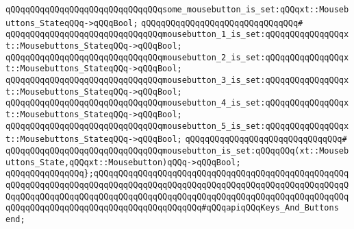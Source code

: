 \verb|qQQqqQQqqQQqqQQqqQQqqQQqqQQqqQQqsome_mousebutton_is_set:qQQqxt::Mousebuttons_StateqQQq->qQQqBool;|\newline
\verb|qQQqqQQqqQQqqQQqqQQqqQQqqQQqqQQq#|\newline
\verb|qQQqqQQqqQQqqQQqqQQqqQQqqQQqqQQqmousebutton_1_is_set:qQQqqQQqqQQqqQQqxt::Mousebuttons_StateqQQq->qQQqBool;|\newline
\verb|qQQqqQQqqQQqqQQqqQQqqQQqqQQqqQQqmousebutton_2_is_set:qQQqqQQqqQQqqQQqxt::Mousebuttons_StateqQQq->qQQqBool;|\newline
\verb|qQQqqQQqqQQqqQQqqQQqqQQqqQQqqQQqmousebutton_3_is_set:qQQqqQQqqQQqqQQqxt::Mousebuttons_StateqQQq->qQQqBool;|\newline
\verb|qQQqqQQqqQQqqQQqqQQqqQQqqQQqqQQqmousebutton_4_is_set:qQQqqQQqqQQqqQQqxt::Mousebuttons_StateqQQq->qQQqBool;|\newline
\verb|qQQqqQQqqQQqqQQqqQQqqQQqqQQqqQQqmousebutton_5_is_set:qQQqqQQqqQQqqQQqxt::Mousebuttons_StateqQQq->qQQqBool;|\newline
\verb|qQQqqQQqqQQqqQQqqQQqqQQqqQQqqQQq#|\newline
\verb|qQQqqQQqqQQqqQQqqQQqqQQqqQQqqQQqmousebutton_is_set:qQQqqQQq(xt::Mousebuttons_State,qQQqxt::Mousebutton)qQQq->qQQqBool;|\newline
\newline
\verb|qQQqqQQqqQQqqQQq};qQQqqQQqqQQqqQQqqQQqqQQqqQQqqQQqqQQqqQQqqQQqqQQqqQQqqQQqqQQqqQQqqQQqqQQqqQQqqQQqqQQqqQQqqQQqqQQqqQQqqQQqqQQqqQQqqQQqqQQqqQQqqQQqqQQqqQQqqQQqqQQqqQQqqQQqqQQqqQQqqQQqqQQqqQQqqQQqqQQqqQQqqQQqqQQqqQQqqQQqqQQqqQQqqQQqqQQqqQQqqQQqqQQqqQQq#qQQqapiqQQqKeys_And_Buttons|\newline
\newline
\verb|end;|\newline
\newline

